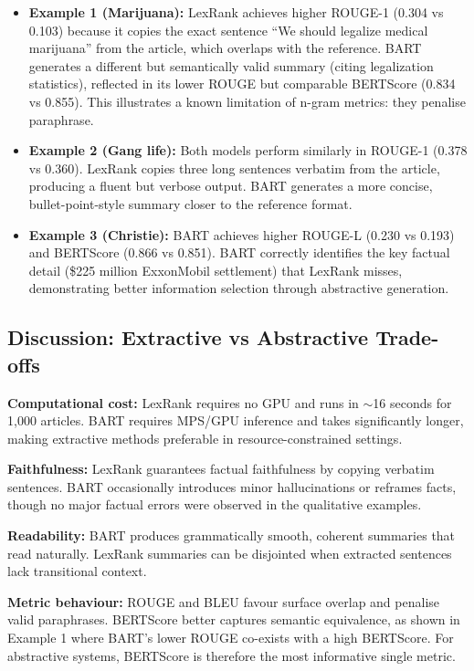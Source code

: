 \documentclass[11pt,a4paper]{article}
\begin{document}
\begin{itemize}
    \item \textbf{Example 1 (Marijuana):} LexRank achieves higher ROUGE-1 (0.304 vs 0.103) because it copies the exact sentence ``We should legalize medical marijuana'' from the article, which overlaps with the reference. BART generates a different but semantically valid summary (citing legalization statistics), reflected in its lower ROUGE but comparable BERTScore (0.834 vs 0.855). This illustrates a known limitation of n-gram metrics: they penalise paraphrase.

    \item \textbf{Example 2 (Gang life):} Both models perform similarly in ROUGE-1 (0.378 vs 0.360). LexRank copies three long sentences verbatim from the article, producing a fluent but verbose output. BART generates a more concise, bullet-point-style summary closer to the reference format.

    \item \textbf{Example 3 (Christie):} BART achieves higher ROUGE-L (0.230 vs 0.193) and BERTScore (0.866 vs 0.851). BART correctly identifies the key factual detail (\$225 million ExxonMobil settlement) that LexRank misses, demonstrating better information selection through abstractive generation.
\end{itemize}

\subsection{Discussion: Extractive vs Abstractive Trade-offs}

\textbf{Computational cost:} LexRank requires no GPU and runs in $\sim$16 seconds for 1{,}000 articles. BART requires MPS/GPU inference and takes significantly longer, making extractive methods preferable in resource-constrained settings.

\textbf{Faithfulness:} LexRank guarantees factual faithfulness by copying verbatim sentences. BART occasionally introduces minor hallucinations or reframes facts, though no major factual errors were observed in the qualitative examples.

\textbf{Readability:} BART produces grammatically smooth, coherent summaries that read naturally. LexRank summaries can be disjointed when extracted sentences lack transitional context.

\textbf{Metric behaviour:} ROUGE and BLEU favour surface overlap and penalise valid paraphrases. BERTScore better captures semantic equivalence, as shown in Example 1 where BART's lower ROUGE co-exists with a high BERTScore. For abstractive systems, BERTScore is therefore the most informative single metric.
\end{document}
